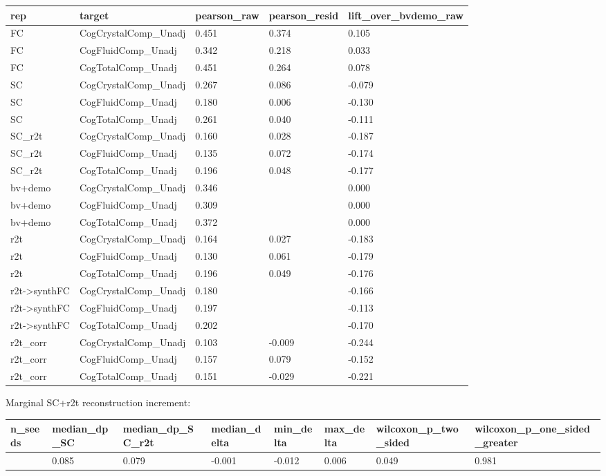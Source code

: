 {\def\LTcaptype{none} %
\begin{longtable}[]{@{}lllll@{}}
\toprule\noalign{}
rep & target & pearson\_raw & pearson\_resid & lift\_over\_bvdemo\_raw \\
\midrule\noalign{}
\endhead
\bottomrule\noalign{}
\endlastfoot
FC & CogCrystalComp\_Unadj & 0.451 & 0.374 & 0.105 \\
FC & CogFluidComp\_Unadj & 0.342 & 0.218 & 0.033 \\
FC & CogTotalComp\_Unadj & 0.451 & 0.264 & 0.078 \\
SC & CogCrystalComp\_Unadj & 0.267 & 0.086 & -0.079 \\
SC & CogFluidComp\_Unadj & 0.180 & 0.006 & -0.130 \\
SC & CogTotalComp\_Unadj & 0.261 & 0.040 & -0.111 \\
SC\_r2t & CogCrystalComp\_Unadj & 0.160 & 0.028 & -0.187 \\
SC\_r2t & CogFluidComp\_Unadj & 0.135 & 0.072 & -0.174 \\
SC\_r2t & CogTotalComp\_Unadj & 0.196 & 0.048 & -0.177 \\
bv+demo & CogCrystalComp\_Unadj & 0.346 & & 0.000 \\
bv+demo & CogFluidComp\_Unadj & 0.309 & & 0.000 \\
bv+demo & CogTotalComp\_Unadj & 0.372 & & 0.000 \\
r2t & CogCrystalComp\_Unadj & 0.164 & 0.027 & -0.183 \\
r2t & CogFluidComp\_Unadj & 0.130 & 0.061 & -0.179 \\
r2t & CogTotalComp\_Unadj & 0.196 & 0.049 & -0.176 \\
r2t-\textgreater synthFC & CogCrystalComp\_Unadj & 0.180 & & -0.166 \\
r2t-\textgreater synthFC & CogFluidComp\_Unadj & 0.197 & & -0.113 \\
r2t-\textgreater synthFC & CogTotalComp\_Unadj & 0.202 & & -0.170 \\
r2t\_corr & CogCrystalComp\_Unadj & 0.103 & -0.009 & -0.244 \\
r2t\_corr & CogFluidComp\_Unadj & 0.157 & 0.079 & -0.152 \\
r2t\_corr & CogTotalComp\_Unadj & 0.151 & -0.029 & -0.221 \\
\end{longtable}
}

Marginal SC+r2t reconstruction increment:

{\def\LTcaptype{none} %
\begin{longtable}[]{@{}llllllll@{}}
\toprule\noalign{}
n\_seeds & median\_dp\_SC & median\_dp\_SC\_r2t & median\_delta & min\_delta & max\_delta & wilcoxon\_p\_two\_sided & wilcoxon\_p\_one\_sided\_greater \\
\midrule\noalign{}
\endhead
\bottomrule\noalign{}
\endlastfoot
10 & 0.085 & 0.079 & -0.001 & -0.012 & 0.006 & 0.049 & 0.981 \\
\end{longtable}
}


